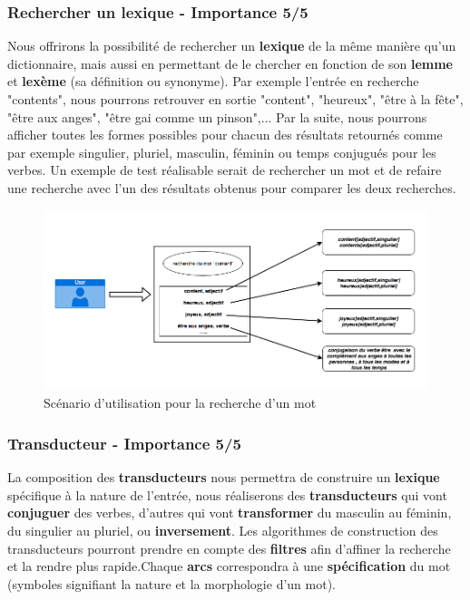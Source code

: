 \subsubsection{Rechercher un lexique - Importance 5/5}

{Nous offrirons la possibilité de rechercher un \textbf{lexique} de la même manière qu'un dictionnaire, mais aussi en permettant de le chercher en fonction de son \textbf{lemme} et \textbf{lexème} (sa définition ou synonyme). Par exemple l'entrée en recherche "contents", nous pourrons retrouver en sortie "content", "heureux", "être à la fête", "être aux anges", "être gai comme un pinson",... Par la suite, nous pourrons afficher toutes les formes possibles pour chacun des résultats retournés comme par exemple singulier, pluriel, masculin, féminin ou temps conjugués pour les verbes. Un exemple de test réalisable serait de rechercher un mot et de refaire une recherche avec l'un des résultats obtenus pour comparer les deux recherches.\par}

\begin{figure}[ht]
    \centering
    \includegraphics[scale=0.5]{exemple.png}
    \caption{Scénario d'utilisation pour la recherche d'un mot }
\end{figure}
\newpage

\subsubsection{Transducteur - Importance 5/5}


La composition des \textbf{transducteurs} nous permettra de construire un \textbf{lexique} spécifique à la nature de l'entrée, nous réaliserons des \textbf{transducteurs} qui vont \textbf{conjuguer} des verbes, d'autres qui vont \textbf{transformer} du masculin au féminin, du singulier au pluriel, ou \textbf{inversement}. Les algorithmes de construction des transducteurs pourront prendre en compte des \textbf{filtres} afin d'affiner la recherche et la rendre plus rapide.Chaque \textbf{arcs} correspondra à une \textbf{spécification} du mot (symboles signifiant la nature et la morphologie d'un mot).

